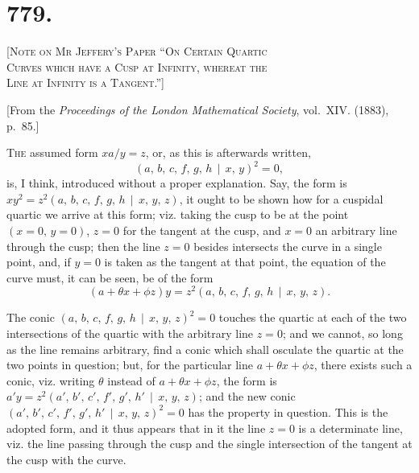 \documentclass[11pt,a4paper]{article}
\theoremstyle{cayley}
\begin{document}
\section*{779.}

\begin{center}
\Large\scshape [Note on Mr Jeffery's Paper ``On Certain Quartic\\Curves which have a Cusp at Infinity, whereat the\\Line at Infinity is a Tangent.'']
\end{center}

\begin{center}
[From the \textit{Proceedings of the London Mathematical Society}, vol.~XIV. (1883), p.~85.]
\end{center}

\textsc{The} assumed form $xa/y = z$, or, as this is afterwards written,
\[
(a,\, b,\, c,\, f,\, g,\, h \,\!\!\mid\!\!\, x,\, y)^{2} = 0,
\]
is, I think, introduced without a proper explanation. Say, the form is $xy^{2} = z^{2}(a,\, b,\, c,\, f,\, g,\, h \,\!\!\mid\!\!\, x,\, y,\, z)$, it ought to be shown how for a cuspidal quartic we arrive at this form; viz. taking the cusp to be at the point $(x=0,\, y=0)$, $z=0$ for the tangent at the cusp, and $x=0$ an arbitrary line through the cusp; then the line $z=0$ besides intersects the curve in a single point, and, if $y=0$ is taken as the tangent at that point, the equation of the curve must, it can be seen, be of the form
\[
(a + \theta x + \phi z)y = z^{2}(a,\, b,\, c,\, f,\, g,\, h \,\!\!\mid\!\!\, x,\, y,\, z).
\]

The conic $(a,\, b,\, c,\, f,\, g,\, h \,\!\!\mid\!\!\, x,\, y,\, z)^{2} = 0$ touches the quartic at each of the two intersections of the quartic with the arbitrary line $z=0$; and we cannot, so long as the line remains arbitrary, find a conic which shall osculate the quartic at the two points in question; but, for the particular line $a + \theta x + \phi z$, there exists such a conic, viz. writing $\theta$ instead of $a + \theta x + \phi z$, the form is $a'y = z^{2}(a',\, b',\, c',\, f',\, g',\, h' \,\!\!\mid\!\!\, x,\, y,\, z)$; and the new conic $(a',\, b',\, c',\, f',\, g',\, h' \,\!\!\mid\!\!\, x,\, y,\, z)^{2} = 0$ has the property in question. This is the adopted form, and it thus appears that in it the line $z=0$ is a determinate line, viz. the line passing through the cusp and the single intersection of the tangent at the cusp with the curve.
\end{document}
